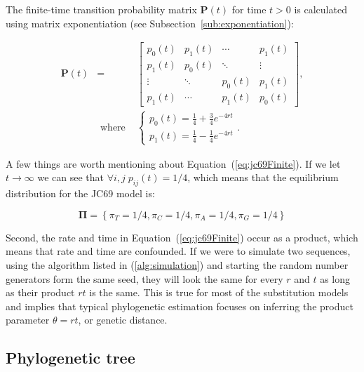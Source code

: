 \noindent
The finite-time transition probability matrix $\mathbf{P}(t)$ for time $t>0$ is calculated using matrix exponentiation  (see Subsection~\ref{sub:exponentiation}):

\begin{eqnarray}
\mathbf{P}\left(t\right) &=& \left[\begin{array}{cccc}
p_{0}(t) & p_{1}(t) & \cdots & p_{1}(t)\\
p_{1}(t) & p_{0}(t) & \ddots & \vdots\\
\vdots & \ddots & p_{0}(t) & p_{1}(t)\\
p_{1}(t) & \cdots & p_{1}(t) & p_{0}(t)
\end{array}\right], \\ \nonumber
&\text{ where }& \ensuremath{\begin{cases}
p_{0}(t)=\frac{1}{4}+\frac{3}{4}e^{-4rt}\\
p_{1}(t)=\frac{1}{4}-\frac{1}{4}e^{-4rt}
\end{cases}}.
\label{eq:jc69Finite}
\end{eqnarray}

\noindent
A few things are worth mentioning about Equation~(\ref{eq:jc69Finite}).
If we let $t\rightarrow \infty$ we can see that $\forall i,j\; p_{ij}(t)=1/4$, which means that the equilibrium distribution for the JC69 model is: 

\begin{equation}
\mathbf{\Pi}=\left\{ \pi_{T}=1/4,\pi_{C}=1/4,\pi_{A}=1/4,\pi_{G}=1/4\right\}
\label{eq:jc69Steady}
\end{equation}

\noindent
Second, the rate and time in Equation~(\ref{eq:jc69Finite}) occur as a product, which means that rate and time are confounded.
If we were to simulate two sequences, using the algorithm listed in (\ref{alg:simulation}) and starting the random number generators form the same seed, they will look the same for every $r$ and $t$ as long as their product $rt$ is the same.
This is true for most of the substitution models and implies that typical phylogenetic estimation focuses on inferring the product parameter $\theta=rt$, or genetic distance.

\subsection{Phylogenetic tree}

